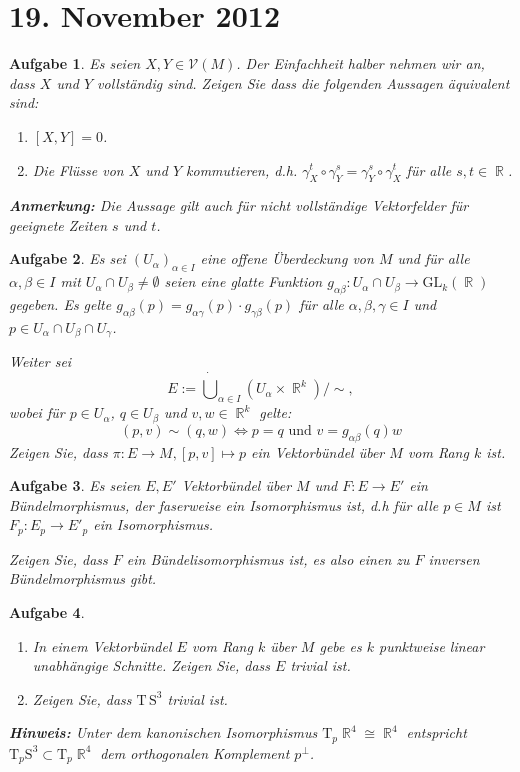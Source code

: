 \documentclass[paper=A4, twoside, chapterprefix=true, bibliography=totoc, headsepline]{scrbook}
\DeclareMathOperator{\R}{\mathbb{R}}
\theoremstyle{plain}
\theoremstyle{nonumberplain}
\theoremstyle{empty}
\theoremstyle{break}
\newtheorem{Aufg}{Aufgabe}
\begin{document}
\section{19. November 2012}
\setcounter{Aufg}{0} %
\setcounter{Loes}{0}

\begin{Aufg}
Es seien $X,Y \in \mathcal{V}(M)$. Der Einfachheit halber nehmen wir an, dass $X$ und $Y$ vollständig sind. Zeigen Sie dass die folgenden Aussagen äquivalent sind:
\begin{enumerate}[label=(\roman*),widest=ii]
\item
	$[X,Y]=0$.
\item
	Die Flüsse von $X$ und $Y$ kommutieren, d.h. $\gamma_X^t \circ \gamma_Y^s=\gamma_Y^s \circ \gamma_X^t$ für alle $s, t \in \R$.
\end{enumerate}
{\footnotesize \textbf{Anmerkung:} Die Aussage gilt auch für nicht vollständige Vektorfelder für geeignete Zeiten $s$ und $t$.}
\end{Aufg}

\begin{Aufg}
Es sei $(U_\alpha)_{\alpha \in I}$ eine offene Überdeckung von $M$ und für alle $\alpha, \beta \in I$ mit $U_\alpha \cap U_\beta \neq \emptyset$ seien eine glatte Funktion $g_{\alpha \beta}:U_\alpha \cap U_\beta \to \mathrm{GL}_k(\R)$ gegeben. Es gelte $g_{\alpha \beta}(p)=g_{\alpha \gamma}(p) \cdot g_{\gamma \beta}(p)$ für alle $\alpha,\beta,\gamma \in I$ und $p \in U_\alpha \cap U_\beta \cap U_\gamma$. 

Weiter sei
	\[E:=\dot{\bigcup}_{\alpha \in I}(U_\alpha \times \R^k)/ \sim, \]
wobei für $p \in U_\alpha$, $q \in U_\beta$ und $v,w \in \R^k$ gelte:
	\[(p,v) \sim (q,w) \Leftrightarrow p=q \text{ und } v=g_{\alpha \beta}(q) w\]
Zeigen Sie, dass $\pi: E \to M, [p,v]\mapsto p$ ein Vektorbündel über $M$ vom Rang $k$ ist.
\end{Aufg}

\begin{Aufg}
Es seien $E, E'$ Vektorbündel über $M$ und $F:E \to E'$ ein Bündelmorphismus, der faserweise ein Isomorphismus ist, d.h für alle $p \in M$ ist $F_p:E_p \to E'_p$ ein Isomorphismus.

Zeigen Sie, dass $F$ ein Bündelisomorphismus ist, es also einen zu $F$ inversen Bündelmorphismus gibt.
\end{Aufg}

\begin{Aufg}\begin{enumerate}[label=\alph*),leftmargin=*,widest=b]
\item
	In einem Vektorbündel $E$ vom Rang $k$ über $M$ gebe es $k$ punktweise linear unabhängige Schnitte. Zeigen Sie, dass $E$ trivial ist.
\item
	Zeigen Sie, dass $\mathrm{T}\,\mathrm{S}^3$ trivial ist.
\end{enumerate}
{\footnotesize \textbf{Hinweis:} Unter dem kanonischen Isomorphismus $\mathrm{T}_p \R^4 \cong \R^4$ entspricht $\mathrm{T}_p\mathrm{S}^3 \subset \mathrm{T}_p\R^4$ dem orthogonalen Komplement $p^{\perp}$.}
\end{Aufg}
\end{document}
